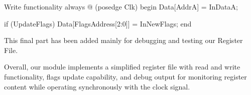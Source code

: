 \begin{code}[37]{Write functionality}
    always @ (posedge Clk) begin
		Data[AddrA] = InDataA;

		if (UpdateFlags)
		Data[FlagsAddress[2:0]] = InNewFlags;
	end
\end{code}
This final part has been added mainly for debugging and testing our Register File.\newline

Overall, our module implements a simplified register file with read and write functionality, flags update capability, and debug output for monitoring register content while operating synchronously with the clock signal.\newline